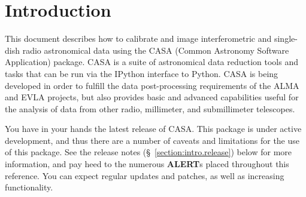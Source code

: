 

\chapter{Introduction}
\label{chapter:intro}


This document describes how to calibrate and image interferometric and
single-dish radio astronomical data using the CASA (Common Astronomy
Software Application) package.  CASA is a suite of
astronomical data reduction tools and tasks that can be run via the
IPython interface to Python.  CASA is being developed in order to 
fulfill the data post-processing requirements of the ALMA and EVLA
projects, but also provides basic and advanced capabilities useful for
the analysis of data from other radio, millimeter, and submillimeter
telescopes.

You have in your hands the latest release of CASA.  This package is
under active development, and thus there are a number of caveats and
limitations for the use of this 
package.  See the release notes (\S~\ref{section:intro.release})
below for more information,
and pay heed to the numerous {\bf ALERT}s placed throughout this
reference.  You can expect regular updates and patches, as well as
increasing functionality.

